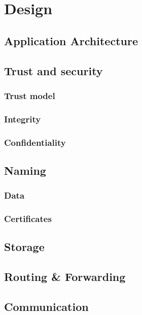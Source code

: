 \section{Design}

\subsection{Application Architecture}

\subsection{Trust and security}
\subsubsection{Trust model} 
\subsubsection{Integrity} 
\subsubsection{Confidentiality}

\subsection{Naming}
\subsubsection{Data}
\subsubsection{Certificates}

\subsection{Storage}

\subsection{Routing \& Forwarding}

\subsection{Communication}
